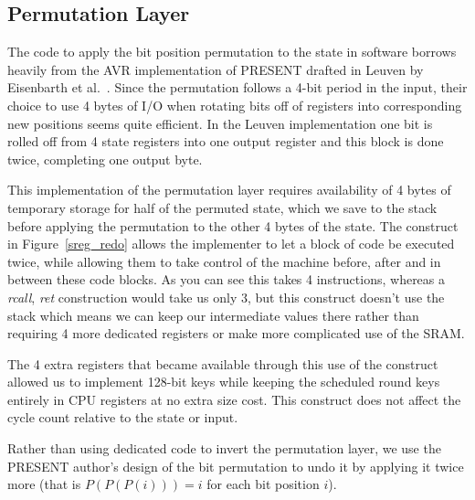 \documentclass[11pt]{llncs2e} %
\begin{document}
\subsection{Permutation Layer}
The code to apply the bit position permutation to the state in software borrows heavily from the AVR implementation of PRESENT drafted in Leuven by Eisenbarth et al.~\cite{eisenbarth2012compact}.
Since the permutation follows a 4-bit period in the input, their choice to use 4 bytes of I/O when rotating bits off of registers into corresponding new positions seems quite efficient.
In the Leuven implementation one bit is rolled off from 4 state registers into one output register and this block is done twice, completing one output byte.

This implementation of the permutation layer requires availability of 4 bytes of temporary storage for half of the permuted state, which we save to the stack before applying the permutation to the other 4 bytes of the state.
The construct in Figure~\ref{sreg_redo} allows the implementer to let a block of code be executed twice, while allowing them to take control of the machine before, after and in between these code blocks.
As you can see this takes 4 instructions, whereas a \textit{rcall}, \textit{ret} construction would take us only 3, but this construct doesn't use the stack which means we can keep our intermediate values there rather than requiring 4 more dedicated registers or make more complicated use of the SRAM.


The 4 extra registers that became available through this use of the construct allowed us to implement 128-bit keys while keeping the scheduled round keys entirely in CPU registers at no extra size cost.
This construct does not affect the cycle count relative to the state or input.

Rather than using dedicated code to invert the permutation layer, we use the PRESENT author's design of the bit permutation to undo it by applying it twice more (that is $P(P(P(i))) = i$ for each bit position $i$).
\end{document}
